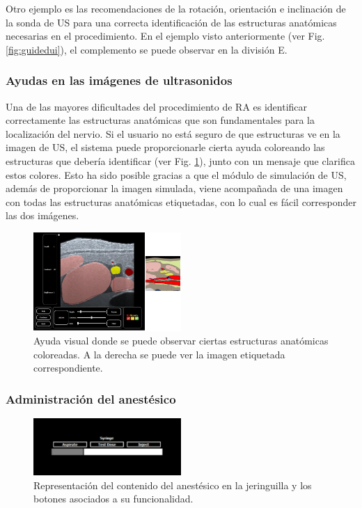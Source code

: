 
Otro ejemplo es las recomendaciones de la rotación, orientación e inclinación de la sonda de \ac{US} para una correcta identificación de las estructuras anatómicas necesarias en el procedimiento. En el ejemplo visto anteriormente (ver Fig. \ref{fig:guidedui}), el complemento se puede observar en la división E.


\subsubsection{Ayudas en las imágenes de ultrasonidos}
Una de las mayores dificultades del procedimiento de \ac{RA} es identificar correctamente las estructuras anatómicas que son fundamentales para la localización del nervio. Si el usuario no está seguro de que estructuras ve en la imagen de \ac{US}, el sistema puede proporcionarle cierta ayuda coloreando las estructuras que debería identificar (ver Fig. \ref{fig:labelus}), junto con un mensaje que clarifica estos colores. Esto ha sido posible gracias a que el módulo de simulación de \ac{US}, además de proporcionar la imagen simulada, viene acompañada de una imagen con todas las estructuras anatómicas etiquetadas, con lo cual es fácil corresponder las dos imágenes.

 
 \begin{figure}[h]
    \centering
    \includegraphics[width=0.5\textwidth]{IMG/labelus.png}
    \caption{Ayuda visual donde se puede observar ciertas estructuras anatómicas coloreadas. A la derecha se puede ver la imagen etiquetada correspondiente.}
    \label{fig:labelus}
\end{figure}
 
 
\subsubsection{Administración del anestésico}
 \begin{figure}[h]
    \centering
    \includegraphics[width=0.5\textwidth]{IMG/Syringe.PNG}
    \caption{ Representación del contenido del anestésico en la jeringuilla y los botones asociados a su funcionalidad.}
    \label{fig:anest}
\end{figure}

